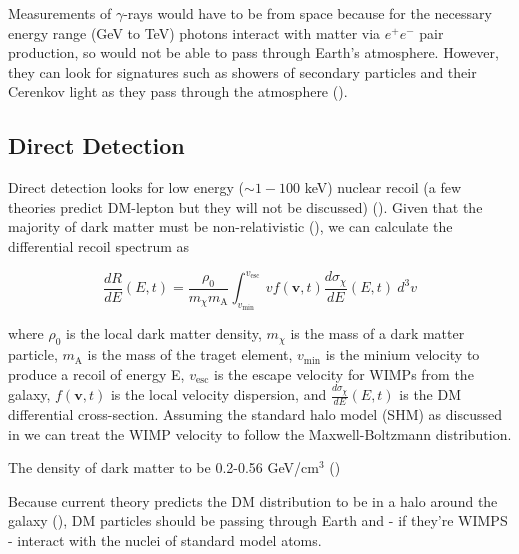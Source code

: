 Measurements of $\gamma$-rays would have to be from space because for the necessary energy range (GeV to TeV) photons interact
with matter via $e^{+}e^{-}$ pair production, so would not be able to pass through Earth's atmosphere.  However,
they can look for signatures such as showers of secondary particles and their Cerenkov
light as they pass through the atmosphere ().



\subsection{Direct Detection} \label{subsec:direct}
Direct detection looks for low energy ($\sim 1-100$ keV) nuclear recoil (a few theories predict DM-lepton
but they will not be discussed) ().  Given that the majority of dark matter must be
non-relativistic (), we can calculate the differential recoil spectrum as 

\begin{equation}
\frac{dR}{dE}(E, t) = \frac{\rho_{0}}{m_{\chi}m_{\mathrm{A}}} \int_{v_{\mathrm{min}}}^{v_{\mathrm{esc}}}
v f(\boldsymbol{v}, t) \frac{d\sigma_{\chi}}{dE}(E, t)\ d^{3}v
\end{equation}

\noindent where $\rho_{0}$ is the local dark matter density, $m_{\chi}$ is the mass of a
dark matter particle, $m_{\mathrm{A}}$ is the mass of the traget element, $v_{\mathrm{min}}$ is the minium velocity to produce
a recoil of energy E, $v_{\mathrm{esc}}$ is the escape velocity for WIMPs from the galaxy,
$f(\boldsymbol{v}, t)$ is the local velocity dispersion, and $\frac{d\sigma_{\chi}}{dE}(E, t)$ is the DM differential
cross-section.  Assuming the standard halo model (SHM) as discussed in  we can treat the WIMP
velocity to follow the Maxwell-Boltzmann distribution.



The
density of dark matter to be 0.2-0.56 GeV/cm$^{3}$ () 


Because current theory
predicts the DM distribution to be in a halo around the galaxy (), DM particles should
be passing through Earth and - if they're WIMPS - interact with the nuclei of standard model atoms.




